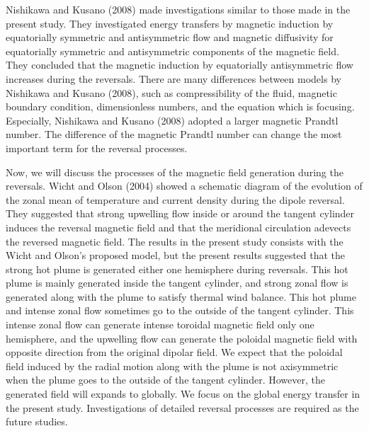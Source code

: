 

Nishikawa and Kusano (2008) \cite{Nishikawa:2008} made investigations similar to those made in the present study.
They investigated energy transfers by magnetic induction by equatorially symmetric and antisymmetric flow and magnetic diffusivity for equatorially symmetric and antisymmetric components of the magnetic field. 
They concluded that the magnetic induction by equatorially antisymmetric flow increases during the reversals. 
There are many differences between models by Nishikawa and Kusano (2008), such as compressibility of the fluid, magnetic boundary condition, dimensionless numbers, and the equation which is focusing. Especially, Nishikawa and Kusano (2008) adopted a larger magnetic Prandtl number. 
The difference of the magnetic Prandtl number can change the most important term for the reversal processes.

Now, we will discuss the processes of the magnetic field generation during the reversals. 
Wicht and Olson (2004) \cite{Wicht:2004} showed a schematic diagram of the evolution of the zonal mean of temperature and current density during the dipole reversal. 
They suggested that strong upwelling flow inside or around the tangent cylinder induces the reversal magnetic field and that the meridional circulation adevects the reversed magnetic field. 
The results in the present study consists with the Wicht and Olson's proposed model, but the present results suggested that the strong hot plume is generated either one hemisphere during reversals. 
This hot plume is mainly generated inside the tangent cylinder, and strong zonal flow is generated along with the plume to satisfy thermal wind balance. 
This hot plume and intense zonal flow sometimes go to the outside of the tangent cylinder. 
This intense zonal flow can generate intense toroidal magnetic field only one hemisphere, and the upwelling flow can generate the poloidal magnetic field with opposite direction from the original dipolar field. 
We expect that the poloidal field induced by the radial motion along with the plume is not axisymmetric when the plume goes to the outside of the tangent cylinder. 
However, the generated field will expands to globally. 
We focus on the global energy transfer in the present study. 
Investigations of detailed reversal processes are required as the future studies.

